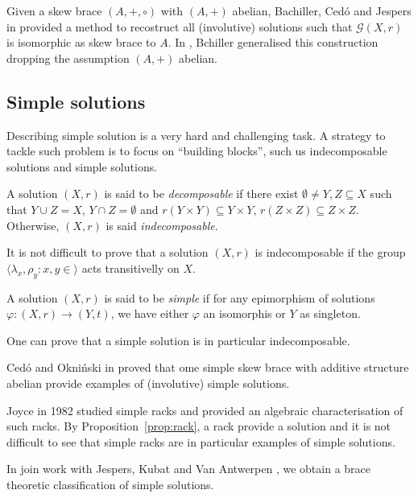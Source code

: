 Given a skew brace $(A,+,\circ)$ with $(A,+)$ abelian, Bachiller, Cedó and Jespers in \cite{} provided a method to recostruct all (involutive) solutions such that $\mathcal{G}(X,r)$ is isomorphic as skew brace to $A$. In \cite{}, Bchiller generalised this construction dropping the assumption $(A,+)$ abelian.

\subsection{Simple solutions}

Describing simple solution is a very hard and challenging task. A strategy to tackle such problem is to focus on ``building blocks'', such us indecomposable solutions and simple solutions. 

\begin{definition}
    A solution $(X,r)$ is said to be \emph{decomposable} if there exist $\emptyset \neq Y,Z \subseteq X$ such that $Y\cup Z = X$, $Y \cap Z = \emptyset$ and $r(Y\times Y)\subseteq Y\times Y$, $r(Z\times Z)\subseteq Z \times Z$. Otherwise, $(X,r)$ is said \emph{indecomposable}.
\end{definition}

It is not difficult to prove that a solution $(X,r)$ is indecomposable if the group $\langle \lambda_x, \rho_y \colon x, y \in \rangle$ acts transitivelly on $X$.

\begin{definition}
    A solution $(X,r)$ is said to be \emph{simple} if for any epimorphism of solutions $\varphi: (X,r) \to (Y,t)$, we have either $\varphi$ an isomorphis or $Y$ as singleton.
\end{definition}

One can prove that a simple solution is in particular indecomposable. 

Cedó and Okniński in \cite{} proved that ome simple skew brace with additive structure abelian provide examples of (involutive) simple solutions. 

Joyce in 1982 studied simple racks and provided an algebraic characterisation of such racks. By Proposition~\ref{prop:rack}, a rack provide a solution and it is not difficult to see that simple racks are in particular examples of simple solutions. 

In join work with Jespers, Kubat and Van Antwerpen \cite{}, we obtain a brace theoretic classification of simple solutions. 

